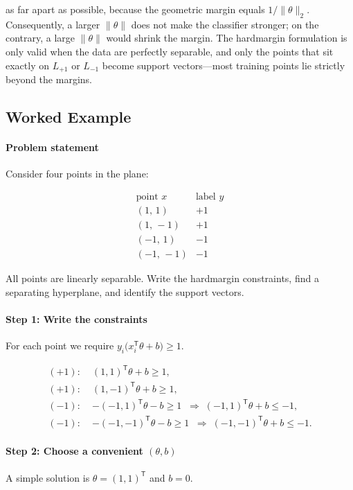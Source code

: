 \documentclass[12pt, a4paper]{article}
\begin{document}
as far apart as possible, because the geometric margin equals \(1/\|\theta\|_{2}\).  Consequently, a larger \(\|\theta\|\) does not make the classifier stronger; on the contrary, a large \(\|\theta\|\) would shrink the margin.  The hardmargin formulation is only valid when the data are perfectly separable, and only the points that sit exactly on \(L_{+1}\) or \(L_{-1}\) become support vectors---most training points lie strictly beyond the margins.  

\subsection{Worked Example}
\paragraph{Problem statement}
Consider four points in the plane:

\[
\begin{array}{c|c}
\text{point }x & \text{label }y \\ \hline
(1,\,1)   & +1 \\
(1,\,-1)  & +1 \\
(-1,\,1)  & -1 \\
(-1,\,-1) & -1
\end{array}
\]

All points are linearly separable.  Write the hardmargin constraints, find a separating hyperplane, and identify the support vectors.

\paragraph{Step 1: Write the constraints}
For each point we require \(y_{i}\bigl(x_{i}^{\mathsf T}\theta + b\bigr) \ge 1\).

\[
\begin{aligned}
(+1):\;& (1,1)^{\mathsf T}\theta + b \ge 1, \\
(+1):\;& (1,-1)^{\mathsf T}\theta + b \ge 1, \\
(-1):\;& -( -1,1)^{\mathsf T}\theta - b \ge 1 \;\; \Longrightarrow\; (-1,1)^{\mathsf T}\theta + b \le -1,\\
(-1):\;& -( -1,-1)^{\mathsf T}\theta - b \ge 1 \;\; \Longrightarrow\; (-1,-1)^{\mathsf T}\theta + b \le -1 .
\end{aligned}
\]

\paragraph{Step 2: Choose a convenient \((\theta,b)\)}
A simple solution is \(\theta = (1,1)^{\mathsf T}\) and \(b = 0\).
\end{document}
